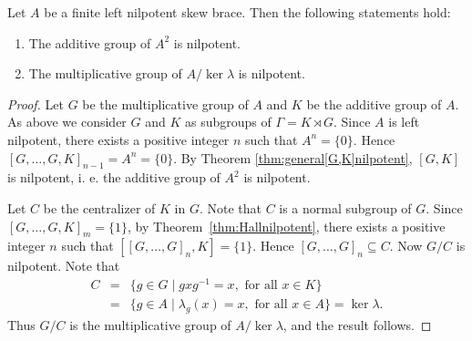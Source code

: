 \begin{theorem}
    \label{thm:A2}
    Let $A$ be a finite left nilpotent skew brace. Then the following statements
    hold:
    \begin{enumerate}
        \item The additive group of $A^2$ is nilpotent.
        \item The multiplicative group of $A/\ker\lambda$ is nilpotent.
    \end{enumerate}
\end{theorem}

\begin{proof} Let $G$ be the multiplicative group of $A$ and $K$ be the additive group of $A$. As above we consider $G$ and $K$ as subgroups of $\Gamma=K\rtimes G$. Since $A$ is left nilpotent, there exists a positive integer $n$ such that $A^n=\{ 0\}$. Hence $[G,\dots ,G,K]_{n-1}=A^n=\{ 0\}$. By Theorem \ref{thm:general[G,K]nilpotent}, $[G,K]$ is nilpotent, i. e. the additive group of $A^2$ is nilpotent.

 Let $C$ be the centralizer of $K$ in $G$. Note that $C$ is a normal subgroup of $G$. Since $[G,\dots ,G,K]_m=\{ 1\}$, by
Theorem~\ref{thm:Hallnilpotent}, there exists a positive integer $n$ such that $[[G,\dots ,G]_n,K]=\{ 1\}$. Hence $[G,\dots ,G]_n\subseteq C$. Now $G/C$ is nilpotent. Note that
    \begin{eqnarray*} C&=&\{ g\in G\mid gxg^{-1}=x, \text{ for all } x\in K\}\\
    &=&\{ g\in A\mid \lambda_g(x)=x, \text{ for all } x\in A\}=\ker\lambda.
    \end{eqnarray*}
     Thus $G/C$ is the multiplicative group of $A/\ker\lambda$, and the result follows.
\end{proof}


